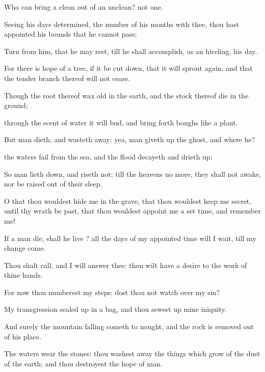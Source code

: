 {Who can
bring a
clean
{} out of an
unclean? not
one.

Seeing his
days
{}
determined, the
number of his
months
{} with thee, thou hast
appointed his
bounds that he cannot
pass;

Turn from him, that he may
rest, till he shall
accomplish, as an
hireling, his
day.


\par }{\PP {}For there
is
hope of a
tree, if it be cut
down, that it will sprout
again, and that the tender
branch thereof will not
cease.

Though the
root thereof wax
old in the
earth, and the
stock thereof
die in the
ground;

 through the
scent of
water it will
bud, and bring
forth
boughs like a
plant.

But
man
dieth, and wasteth
away: yea,
man giveth up the
ghost, and where
{} he?

 the
waters
fail from the
sea, and the
flood
decayeth and drieth
up:

So
man lieth
down, and
riseth not: till the
heavens
{} no
more, they shall not
awake, nor be raised
out of their
sleep.

O
that thou wouldest
hide me in the
grave, that thou wouldest keep me
secret, until thy
wrath be
past, that thou wouldest
appoint me a set
time, and
remember me!

If a
man
die, shall he
live
{}? all the
days of my appointed
time will I
wait, till my
change
come.

Thou shalt
call, and I will
answer thee: thou wilt have a
desire to the
work of thine
hands.


\par }{\PP {}For now thou
numberest my
steps: dost thou not
watch over my
sin?

My
transgression
{} sealed
up in a
bag, and thou sewest
up mine
iniquity.

And
surely the
mountain
falling cometh to
nought, and the
rock is
removed out of his
place.

The
waters
wear the
stones: thou washest
away the things which
grow
{} of the
dust of the
earth; and thou
destroyest the
hope of
man.

}
